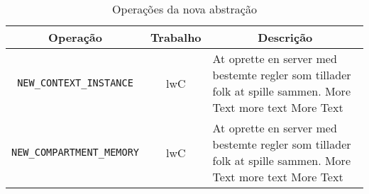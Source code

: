 \begin{table}[h]
\centering
{\renewcommand\arraystretch{1.25}
  \begin{tabular}{|c|c|l|l|} \hline
  \textbf{Operação} & \textbf{Trabalho} & \multicolumn{2}{c|}{\textbf{Descrição}} \\ \hline\hline
  \texttt{NEW\_CONTEXT\_INSTANCE} & lwC & \multicolumn{2}{p{7cm}|}{\raggedright At oprette en server med bestemte regler som tillader folk at spille sammen. More Text more text More Text} \\ \hline
  \texttt{NEW\_COMPARTMENT\_MEMORY} & lwC & \multicolumn{2}{p{7cm}|}{\raggedright At oprette en server med bestemte regler som tillader folk at spille sammen. More Text more text More Text} \\ \hline
  \end{tabular}}
\caption{Operações da nova abstração}
\label{tab:ops_atomize}

\end{table}

%


